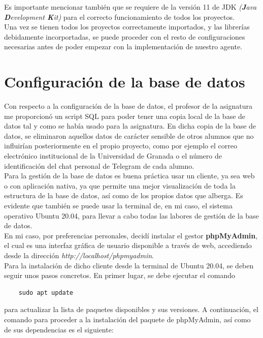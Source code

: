 Es importante mencionar también que se requiere de la versión 11 de JDK \textit{(\textbf{J}ava \textbf{D}evelopment \textbf{K}it)} para el correcto funcionamiento de todos los proyectos.\\

Una vez se tienen todos los proyectos correctamente importados, y las librerías debidamente incorportadas, se puede proceder con el resto de configuraciones necesarias antes de poder empezar con la implementación de nuestro agente.

\section{Configuración de la base de datos}

Con respecto a la configuración de la base de datos, el profesor de la asignatura me proporcionó un script SQL para poder tener una copia local de la base de datos tal y como se había usado para la asignatura. En dicha copia de la base de datos, se eliminaron aquellos datos de carácter sensible de otros alumnos que no influirían posteriormente en el propio proyecto, como por ejemplo el correo electrónico institucional de la Universidad de Granada o el número de identificación del chat personal de Telegram de cada alumno.\\

Para la gestión de la base de datos es buena práctica usar un cliente, ya sea web o con aplicación nativa, ya que permite una mejor visualización de toda la estructura de la base de datos, así como de los propios datos que alberga. Es evidente que también se puede usar la terminal de, en mi caso, el sistema operativo Ubuntu 20.04, para llevar a cabo todas las labores de gestión de la base de datos.\\

En mi caso, por preferencias personales, decidí instalar el gestor \textbf{phpMyAdmin}, el cual es una interfaz gráfica de usuario disponible a través de web, accediendo desde la dirección \textit{http://localhost/phpmyadmin}.\\

Para la instalación de dicho cliente desde la terminal de Ubuntu 20.04, se deben seguir unos pasos concretos. En primer lugar, se debe ejecutar el comando

\begin{lstlisting}
    sudo apt update
\end{lstlisting}

para actualizar la lista de paquetes disponibles y sus versiones. A continuación, el comando para proceder a la instalación del paquete de phpMyAdmin, así como de sus dependencias es el siguiente:

